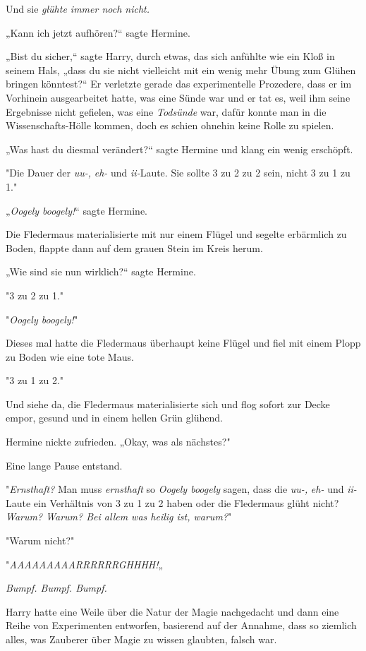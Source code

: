 {Und sie \emph{glühte immer noch nicht.}

„Kann ich jetzt aufhören?“ sagte Hermine.

„Bist du sicher,“ sagte Harry, durch etwas, das sich anfühlte wie ein Kloß in seinem Hals, „dass du sie nicht vielleicht mit ein wenig mehr Übung zum Glühen bringen könntest?“ Er verletzte gerade das experimentelle Prozedere, dass er im Vorhinein ausgearbeitet hatte, was eine Sünde war und er tat es, weil ihm seine Ergebnisse nicht gefielen, was eine \emph{Todsünde} war, dafür konnte man in die Wissenschafts-Hölle kommen, doch es schien ohnehin keine Rolle zu spielen.

„Was hast du diesmal verändert?“ sagte Hermine und klang ein wenig erschöpft.

"Die Dauer der \emph{uu-,} \emph{eh-} und \emph{ii-}Laute. Sie sollte 3 zu 2 zu 2 sein, nicht 3 zu 1 zu 1."

„\emph{Oogely boogely!}“ sagte Hermine.

Die Fledermaus materialisierte mit nur einem Flügel und segelte erbärmlich zu Boden, flappte dann auf dem grauen Stein im Kreis herum.

„Wie sind sie nun wirklich?“ sagte Hermine.

"3 zu 2 zu 1."

"\emph{Oogely boogely!}"

Dieses mal hatte die Fledermaus überhaupt keine Flügel und fiel mit einem Plopp zu Boden wie eine tote Maus.

"3 zu 1 zu 2."

Und siehe da, die Fledermaus materialisierte sich und flog sofort zur Decke empor, gesund und in einem hellen Grün glühend.

Hermine nickte zufrieden. „Okay, was als nächstes?"

Eine lange Pause entstand.

"\emph{Ernsthaft?} Man muss \emph{ernsthaft} so \emph{Oogely boogely} sagen, dass die \emph{uu-,} \emph{eh-} und \emph{ii-}Laute ein Verhältnis von 3 zu 1 zu 2 haben oder die Fledermaus glüht nicht? \emph{Warum? Warum? Bei allem was heilig ist, warum?}"

"Warum nicht?"

"\emph{AAAAAAAAARRRRRRGHHHH!}„

\emph{Bumpf. Bumpf. Bumpf.}

Harry hatte eine Weile über die Natur der Magie nachgedacht und dann eine Reihe von Experimenten entworfen, basierend auf der Annahme, dass so ziemlich alles, was Zauberer über Magie zu wissen glaubten, falsch war.

}
